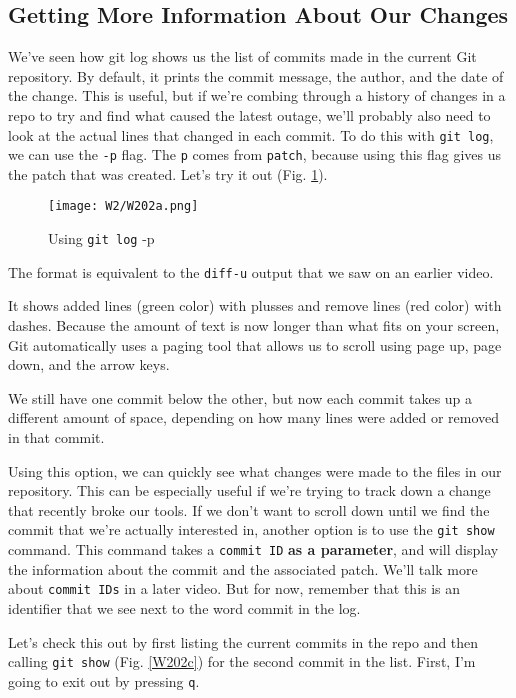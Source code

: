 	\subsection{Getting More Information About Our Changes}
	
	We've seen how git log shows us the list of commits made in the current Git repository. By default, it prints the commit message, the author, and the date of the change. This is useful, but if we're combing through a history of changes in a repo to try and find what caused the latest outage, we'll probably also need to look at the actual lines that changed in each commit. To do this with \texttt{git log}, we can use the \verb|-p| flag. The \texttt{p} comes from \texttt{patch}, because using this flag gives us the patch that was created. Let's try it out (Fig. \ref{W202a}).
	
	\begin{figure} 
		\caption{Using \texttt{git log} -p}
		\centering
		\texttt{[image: W2/W202a.png]}
		\label{W202a}
	\end{figure}
		
	The format is equivalent to the \verb|diff-u| output that we saw on an earlier video.
	
	It shows added lines (green color) with plusses and remove lines (red color) with dashes. Because the amount of text is now longer than what fits on your screen, Git automatically uses a paging tool that allows us to scroll using page up, page down, and the arrow keys.
		
	We still have one commit below the other, but now each commit takes up a different amount of space, depending on how many lines were added or removed in that commit.
	
	Using this option, we can quickly see what changes were made to the files in our repository. This can be especially useful if we're trying to track down a change that recently broke our tools. If we don't want to scroll down until we find the commit that we're actually interested in, another option is to use the \texttt{git show} command. This command takes a \texttt{commit ID} \textbf{as a parameter}, and will display the information about the commit and the associated patch. We'll talk more about \texttt{commit IDs} in a later video. But for now, remember that this is an identifier that we see next to the word commit in the log.
	
	Let's check this out by first listing the current commits in the repo and then calling \texttt{git show} (Fig. \ref{W202c}) for the second commit in the list. First, I'm going to exit out by pressing \texttt{q}.


